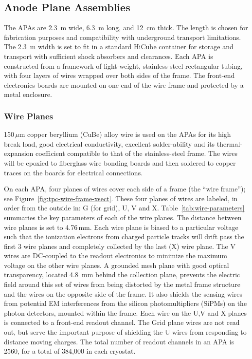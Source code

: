 \subsection{Anode Plane Assemblies}
\label{subsec:fd-ref-apa}

The APAs are 2.3~m wide, 6.3~m long, and 12~cm thick. The length is chosen for fabrication purposes and compatibility with underground transport limitations. The 2.3~m width is set to fit in a standard HiCube container for storage and transport with sufficient shock absorbers and clearances. 
Each APA is constructed from a framework of light-weight, stainless-steel rectangular tubing, with four layers of wires wrapped over both sides of the frame. The front-end electronics boards are mounted on one end of the wire frame and protected by a metal enclosure.  


\subsubsection{Wire Planes}
\label{subsec:fd-ref-wireplanes}

150\,$\mu$m copper beryllium (CuBe) alloy wire is used on the APAs for its high break load, good electrical conductivity, excellent solder-ability and its thermal-expansion coefficient compatible to that of the stainless-steel frame.  The wires will be epoxied to fiberglass wire bonding boards and then soldered to copper traces on the boards for electrical connections.

On each APA, four planes of wires cover each side of a frame (the ``wire frame''); see Figure~\ref{fig:tpc-wire-frame-xsect}.
These four planes of wires are labeled, in order from the outside in: G (for grid), U, V and X.  
Table~\ref{tab:wire-parameters} summaries the key parameters of each of the wire planes.  The distance between wire planes is set to 4.76\,mm.  Each wire plane is biased to a particular voltage such that the ionization electrons from charged particle tracks will drift pass the first 3 wire planes and completely collected by the last (X) wire plane.  The V wires are DC-coupled to the readout electronics to minimize the maximum voltage on the other wire planes.
A grounded mesh plane with good optical transparency, located 4.8~mm behind the collection plane, prevents the electric field around this set of wires from being distorted by the metal frame structure and the wires on the opposite side of the frame. It also shields the sensing wires from potential EM interferences from the silicon photomultipliers (SiPMs) on the photon detectors, mounted within the frame.  
Each wire on the U,V and X planes is connected to a front-end readout channel. The Grid plane wires are not read out, but serve the important purpose of shielding the U wires from responding to distance moving charges. The total number of readout channels in an APA is 2560, for a total of 384,000 in each cryostat.



